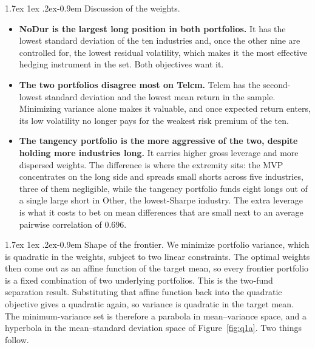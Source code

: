 \documentclass[11pt]{article}
\makeatletter
\renewcommand\paragraph{\@startsection{paragraph}{4}{0pt}%
  {1.7ex \@plus 1ex \@minus .2ex}{-0.9em}%
  {\normalfont\bfseries\normalsize\color{psink}}}
\makeatother
\begin{document}
\paragraph{Discussion of the weights.}
\begin{itemize}
\setlength{\itemsep}{4pt}\setlength{\parskip}{0pt}

\item \textbf{NoDur is the largest long position in both portfolios.} It has
the lowest standard deviation of the ten industries and, once the other nine
are controlled for, the lowest residual volatility, which makes it the most
effective hedging instrument in the set. Both objectives want it.

\item \textbf{The two portfolios disagree most on Telcm.} Telcm has the
second-lowest standard deviation and the lowest mean return in the sample.
Minimizing variance alone makes it valuable, and once expected return enters,
its low volatility no longer pays for the weakest risk premium of the ten.

\item \textbf{The tangency portfolio is the more aggressive of the two,
despite holding more industries long.} It carries higher gross leverage and
more dispersed weights. The difference is where the extremity sits: the MVP
concentrates on the long side and spreads small shorts across five industries,
three of them negligible, while the tangency portfolio funds eight longs out
of a single large short in Other, the lowest-Sharpe industry. The extra
leverage is what it costs to bet on mean differences that are small next to an
average pairwise correlation of 0.696.

\end{itemize}

\paragraph{Shape of the frontier.} We minimize portfolio variance, which is
quadratic in the weights, subject to two linear constraints. The optimal
weights then come out as an affine function of the target mean, so every
frontier portfolio is a fixed combination of two underlying portfolios. This
is the two-fund separation result. Substituting that affine function back into
the quadratic objective gives a quadratic again, so variance is quadratic in
the target mean. The minimum-variance set is therefore a parabola in
mean--variance space, and a hyperbola in the mean--standard deviation space of
Figure~\ref{fig:q1a}. Two things follow.
\end{document}
